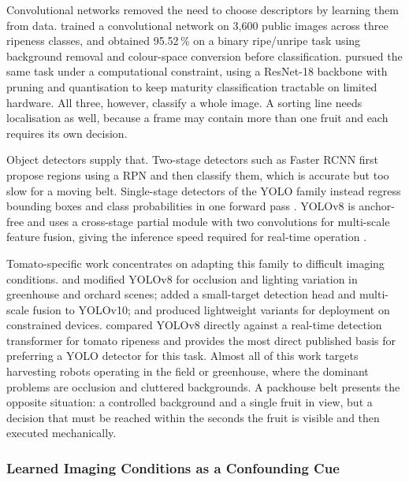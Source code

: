 Convolutional networks removed the need to choose descriptors by learning them from data. \citet{allo2025} trained a convolutional network on 3,600 public images across three ripeness classes, and \citet{centino2025} obtained 95.52\,\% on a binary ripe/unripe task using background removal and colour-space conversion before classification. \citet{waseem2025} pursued the same task under a computational constraint, using a ResNet-18 backbone with pruning and quantisation to keep maturity classification tractable on limited hardware. All three, however, classify a whole image. A sorting line needs localisation as well, because a frame may contain more than one fruit and each requires its own decision.

Object detectors supply that. Two-stage detectors such as Faster \acrshort{RCNN} first propose regions using a \acrfull{RPN} and then classify them, which is accurate but too slow for a moving belt. Single-stage detectors of the \acrshort{YOLO} family instead regress bounding boxes and class probabilities in one forward pass \citep{redmon2016}. YOLOv8 is anchor-free and uses a cross-stage partial module with two convolutions for multi-scale feature fusion, giving the inference speed required for real-time operation \citep{terven2023}.

Tomato-specific work concentrates on adapting this family to difficult imaging conditions. \citet{yang2025} and \citet{fan2026} modified YOLOv8 for occlusion and lighting variation in greenhouse and orchard scenes; \citet{huang2025} added a small-target detection head and multi-scale fusion to YOLOv10; \citet{wang2026} and \citet{ding2026} produced lightweight variants for deployment on constrained devices. \citet{safira2026} compared YOLOv8 directly against a real-time detection transformer for tomato ripeness and provides the most direct published basis for preferring a \acrshort{YOLO} detector for this task. Almost all of this work targets harvesting robots operating in the field or greenhouse, where the dominant problems are occlusion and cluttered backgrounds. A packhouse belt presents the opposite situation: a controlled background and a single fruit in view, but a decision that must be reached within the seconds the fruit is visible and then executed mechanically.

\subsubsection{Learned Imaging Conditions as a Confounding Cue}
\label{sec:domainshift}


